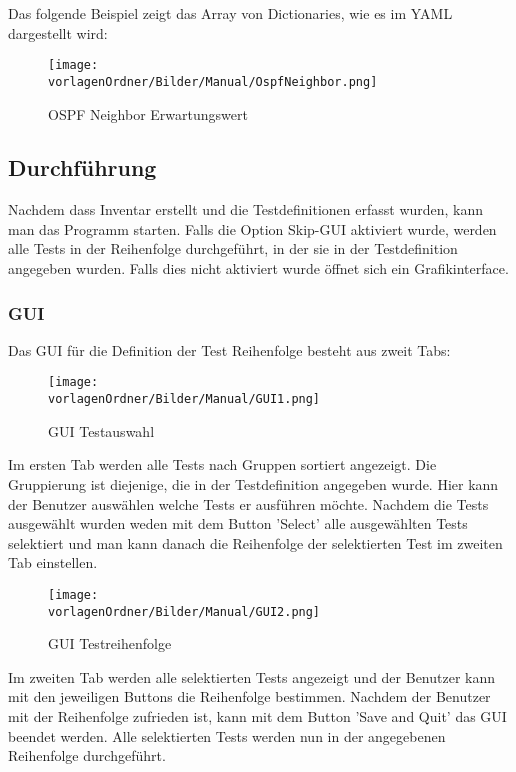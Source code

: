 \documentclass[]{subfiles}
\begin{document}
			
			Das folgende Beispiel zeigt das Array von Dictionaries, wie es im YAML dargestellt wird:

			\begin{figure}[h!]
				\begin{center}
					\texttt{[image: \\vorlagenOrdner/Bilder/Manual/OspfNeighbor.png]}
					\caption{OSPF Neighbor Erwartungswert}
				\end{center}
			\end{figure}

\subsection{Durchführung}
	Nachdem dass Inventar erstellt und die Testdefinitionen erfasst wurden,
	kann man das Programm starten.
	Falls die Option Skip-GUI aktiviert wurde, werden alle Tests in der Reihenfolge durchgeführt,
	in der sie in der Testdefinition angegeben wurden. 
	Falls dies nicht aktiviert wurde öffnet sich ein Grafikinterface.

	\subsubsection{GUI}
		Das GUI für die Definition der Test Reihenfolge besteht aus zweit Tabs:

		\begin{figure}[h!]
			\begin{center}
				\texttt{[image: \\vorlagenOrdner/Bilder/Manual/GUI1.png]}
				\caption{GUI Testauswahl}
			\end{center}
		\end{figure}

		Im ersten Tab werden alle Tests nach Gruppen sortiert angezeigt.
		Die Gruppierung ist diejenige, die in der Testdefinition angegeben wurde. 
		Hier kann der Benutzer auswählen welche Tests er ausführen möchte.
		Nachdem die Tests ausgewählt wurden weden mit dem Button 'Select' 
		alle ausgewählten Tests selektiert und man kann danach die Reihenfolge der
		selektierten Test im zweiten Tab einstellen.

		\begin{figure}[h!]
			\begin{center}
				\texttt{[image: \\vorlagenOrdner/Bilder/Manual/GUI2.png]}
				\caption{GUI Testreihenfolge}
			\end{center}
		\end{figure}

		Im zweiten Tab werden alle selektierten Tests angezeigt und der Benutzer 
		kann mit den jeweiligen Buttons die Reihenfolge bestimmen.
		Nachdem der Benutzer mit der Reihenfolge zufrieden ist,
		kann mit dem Button 'Save and Quit' das GUI beendet werden.
		Alle selektierten Tests werden nun in der angegebenen Reihenfolge durchgeführt.
\end{document}
